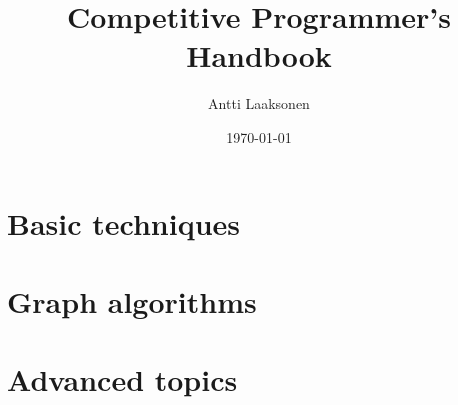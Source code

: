 \documentclass[twoside,12pt,a4paper,english]{book}
\date{\Large \today}
\title{\Huge Competitive Programmer's Handbook}
\author{\Large Antti Laaksonen}
\begin{document}


\frontmatter
\maketitle
\setcounter{tocdepth}{1}
\tableofcontents



\mainmatter
{}
\setcounter{page}{1}

\newcommand{\key}[1] {\textbf{#1}}

\part{Basic techniques}










\part{Graph algorithms}










\part{Advanced topics}












\cleardoublepage
\printindex
\end{document}
